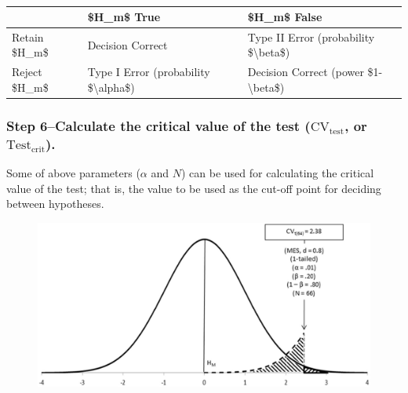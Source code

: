 \documentclass[
]{book}
\theoremstyle{definition}
\theoremstyle{definition}
\theoremstyle{definition}
\theoremstyle{definition}
\theoremstyle{remark}
\begin{document}
\begin{table}

\caption{\label{tab:unnamed-chunk-253}}
\centering
\begin{tabular}[t]{lll}
\toprule
  & \$H\_m\$ True & \$H\_m\$ False\\
\midrule
Retain \$H\_m\$ & Decision Correct & Type II Error (probability \$\textbackslash{}beta\$)\\
Reject \$H\_m\$ & Type I Error (probability \$\textbackslash{}alpha\$) & Decision Correct (power \$1-\textbackslash{}beta\$)\\
\bottomrule
\end{tabular}
\end{table}

\hypertarget{step-6calculate-the-critical-value-of-the-test-mboxcv_mboxtest-or-mboxtest_mboxcrit.}{%
\subsubsection*{\texorpdfstring{Step 6--Calculate the critical value of the test (\(\mbox{CV}_{\mbox{test}}\), or \(\mbox{Test}_{\mbox{crit}}\)).}{Step 6--Calculate the critical value of the test (\textbackslash mbox\{CV\}\_\{\textbackslash mbox\{test\}\}, or \textbackslash mbox\{Test\}\_\{\textbackslash mbox\{crit\}\}).}}\label{step-6calculate-the-critical-value-of-the-test-mboxcv_mboxtest-or-mboxtest_mboxcrit.}}

Some of above parameters (\(\alpha\) and \(N\)) can be used for calculating the critical value of the test; that is, the value to be used as the cut-off point for deciding between hypotheses.

\begin{figure}

{\centering \includegraphics[width=0.6\linewidth]{images/Perezgonzalez2015Fig5} 

}

\end{figure}
\end{document}
